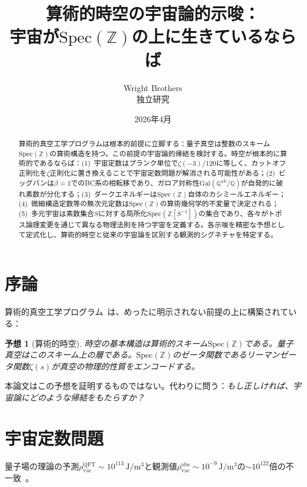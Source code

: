 \documentclass[11pt,a4paper]{article}
\newtheorem{conjecture}[theorem]{予想}
\newcommand{\Spec}{\mathrm{Spec}}
\begin{document}
\title{算術的時空の宇宙論的示唆：\\宇宙が$\Spec(\mathbb{Z})$の上に生きているならば}
\author{Wright Brothers\\{\small 独立研究}}
\date{2026年4月}
\maketitle

\begin{abstract}
算術的真空工学プログラムは根本的前提に立脚する：量子真空は整数のスキーム$\Spec(\mathbb{Z})$の算術構造を持つ。この前提の宇宙論的帰結を検討する。時空が根本的に算術的であるならば：(1)~宇宙定数はプランク単位で$\zeta(-3)/120$に等しく、カットオフ正則化を$\zeta$正則化に置き換えることで宇宙定数問題が解消される可能性がある；(2)~ビッグバンは$\beta=1$でのBC系の相転移であり、ガロア対称性$\mathrm{Gal}(\mathbb{Q}^{\mathrm{ab}}/\mathbb{Q})$が自発的に破れ素数が分化する；(3)~ダークエネルギーは$\Spec(\mathbb{Z})$自体のカシミールエネルギー；(4)~微細構造定数等の無次元定数は$\Spec(\mathbb{Z})$の算術幾何学的不変量で決定される；(5)~多元宇宙は素数集合$S$に対する局所化$\Spec(\mathbb{Z}[S^{-1}])$の集合であり、各々がトポス論理変更を通じて異なる物理法則を持つ宇宙を定義する。各示唆を精密な予想として定式化し、算術的時空と従来の宇宙論を区別する観測的シグネチャを特定する。
\end{abstract}

\section{序論}

算術的真空工学プログラム~\cite{paper_A,paper_B,paper_C}は、めったに明示されない前提の上に構築されている：

\begin{conjecture}[算術的時空]
\label{conj:arith}
時空の基本構造は算術的スキーム$\Spec(\mathbb{Z})$である。量子真空はこのスキーム上の層である。$\Spec(\mathbb{Z})$のゼータ関数であるリーマンゼータ関数$\zeta(s)$が真空の物理的性質をエンコードする。
\end{conjecture}

本論文はこの予想を証明するものではない。代わりに問う：\emph{もし正しければ、宇宙論にどのような帰結をもたらすか？}

\section{宇宙定数問題}

量子場の理論の予測$\rho_{\mathrm{vac}}^{\mathrm{QFT}} \sim 10^{113}\,\mathrm{J/m^3}$と観測値$\rho_{\mathrm{vac}}^{\mathrm{obs}} \sim 10^{-9}\,\mathrm{J/m^3}$の$\sim 10^{122}$倍の不一致~\cite{Weinberg1989}。
\end{document}
